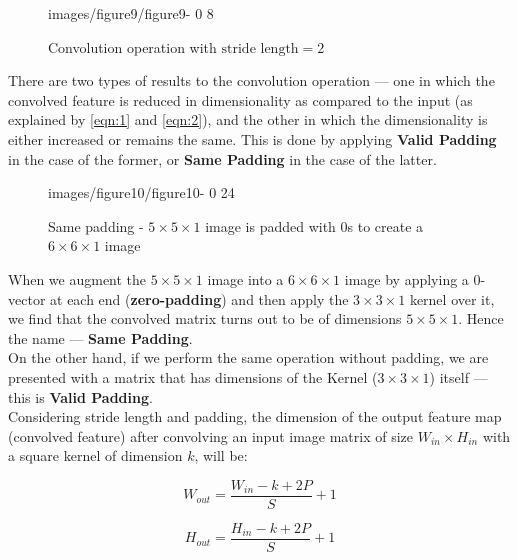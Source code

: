 \begin{figure}
    \centering
    {images/figure9/figure9-} %
    {0} %
    {8} %
    \caption{Convolution operation with $\text{stride length} = 2$}
    \label{fig:9}
\end{figure}

There are two types of results to the convolution operation — one in which the convolved feature is reduced in dimensionality as compared to the input (as explained by \ref{eqn:1} and \ref{eqn:2}), and the other in which the dimensionality is either increased or remains the same. This is done by applying \textbf{Valid Padding} in the case of the former, or \textbf{Same Padding} in the case of the latter.\\

\begin{figure}
    \centering
    {images/figure10/figure10-} %
    {0} %
    {24} %
    \caption{Same padding - $5 \times 5 \times 1$ image is padded with $0$s to create a $6 \times 6 \times 1$ image}
    \label{fig:10}
\end{figure}

When we augment the $5 \times 5 \times 1$ image into a $6 \times 6 \times 1$ image by applying a $0$-vector at each end (\textbf{zero-padding}) and then apply the $3 \times 3 \times 1$ kernel over it, we find that the convolved matrix turns out to be of dimensions $5 \times 5 \times 1$. Hence the name — \textbf{Same Padding}.\\

On the other hand, if we perform the same operation without padding, we are presented with a matrix that has dimensions of the Kernel ($3 \times 3 \times 1$) itself — this is \textbf{Valid Padding}.\\

Considering stride length and padding, the dimension of the output feature map (convolved feature) after convolving an input image matrix of size $W_{in} \times H_{in}$ with a square kernel of dimension $k$, will be:

\begin{equation}
    W_{out} = \frac{W_{in} - k + 2P}{S} +1
    \label{eqn:3}
\end{equation}

\begin{equation}
    H_{out} = \frac{H_{in} - k + 2P}{S} +1
    \label{eqn:4}
\end{equation}

